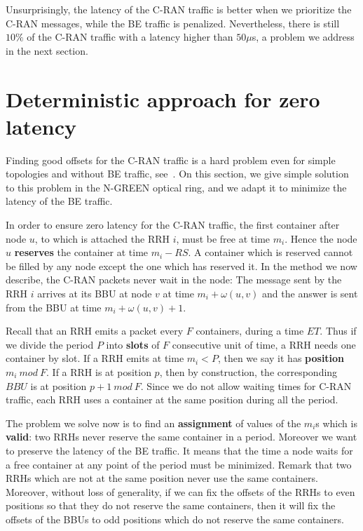 \documentclass[]{llncs}
\begin{document}
Unsurprisingly, the latency of the C-RAN traffic is better when we prioritize the C-RAN messages, while the BE traffic is penalized. Nevertheless, there is still $10\%$ of the C-RAN traffic with a latency higher than $50 \mu$s, a problem we address in the next section.


\section{Deterministic approach for zero latency} \label{sec:deterministicalgorithms}

Finding good offsets for the C-RAN traffic is a hard problem even for simple topologies and without BE traffic, see~\cite{dominique2018deterministic}. On this section, we give simple solution to this problem in the N-GREEN optical ring, and we adapt it to minimize the latency of the BE traffic.

In order to ensure zero latency for the C-RAN traffic, the first container after node $u$, to which is attached the RRH $i$, must be free at time $m_i$. Hence the node $u$ \textbf{reserves} the container at time $m_i - RS$. A container which is reserved cannot be filled by any node except the one which has reserved it. In the method we now describe, the C-RAN packets never wait in the node: The message sent by the RRH $i$ arrives at its BBU at node $v$ at time $m_i + \omega(u,v)$ and the answer is sent from the BBU at time $m_i + \omega(u,v) +1$.

Recall that an RRH emits a packet every $F$ containers, during a time $ET$. 
Thus if we divide the period $P$ into \textbf{slots} of $F$ consecutive unit of time, a RRH needs one container by slot.
 If a RRH emits at time $m_i < P$, then we say it has \textbf{position} $m_i~mod~F$. If a RRH is at position $p$, then by construction, the corresponding $BBU$ is at position $p+1~mod~F$. Since we do not allow waiting times for C-RAN traffic, each RRH uses a container at the same position during all the period.

The problem we solve now is to find an \textbf{assignment} of values of the $m_i$s which is \textbf{valid}: two RRHs never reserve the same container in a period. Moreover we want to preserve the latency of the BE traffic. It means that the time a node waits for a free container at any point of the period must be minimized. 
Remark that two RRHs which are not at the same position never use the same containers. Moreover, without loss of generality, 
if we can fix the offsets of the RRHs to even positions so that they do not reserve the same containers, then it will fix the offsets of the BBUs to odd positions which do not reserve the same containers. 
\end{document}
